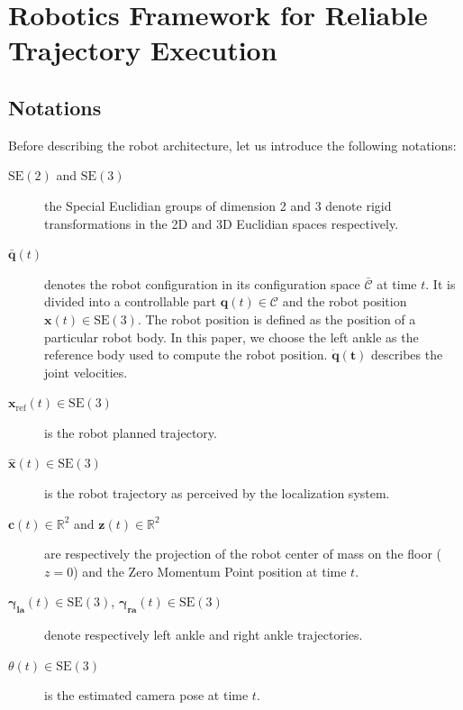 \section{Robotics Framework for Reliable Trajectory Execution}\label{sec:architecture}

\subsection{Notations}
Before describing the robot architecture, let us introduce the following notations:

\begin{description}
\item[$\text{SE}(2)$ and $\text{SE}(3)$]\hspace{1.45cm} the Special Euclidian groups of dimension 2 and 3 denote rigid transformations in the 2D and 3D Euclidian spaces respectively.
\item[$\mathbf{\bar{q}}(t)$] denotes the robot configuration in its configuration space $\mathcal{\bar{C}}$ at time $t$. It is divided into a controllable part $\mathbf{q}(t) \in \mathcal{C}$ and the robot position $\mathbf{x}(t) \in \text{SE}(3)$. The robot position is defined as the position of a particular robot body. In this paper, we choose the left ankle as the reference body used to compute the robot position. $\mathbf{\dot{q}(t)}$ describes the joint velocities.
\item[$\mathbf{x}_{\text{ref}}(t) \in \text{SE}(3)$] \hspace{1.2cm} is the robot planned trajectory.
\item[$\mathbf{\hat{x}}(t) \in \text{SE}(3)$] \hspace{.8cm} is the robot trajectory as perceived by the localization system.
\item[$\mathbf{c}(t) \in \mathbb{R}^2$ and $\mathbf{z}(t) \in
  \mathbb{R}^2$]\hspace{2.6cm} are respectively the projection of the robot center of mass on the floor ($z = 0$) and the Zero Momentum Point position at time $t$.
\item[$\mathbf{\gamma_{\text{la}}}(t) \in \text{SE}(3)$, $\mathbf{\gamma_{\text{ra}}}(t)
  \in \text{SE}(3)$]\hspace{3.4cm} denote respectively left ankle and right ankle trajectories.
\item[$\theta(t) \in \text{SE}(3)$]\hspace{0.8cm} is the estimated camera pose at time $t$.
\end{description}

